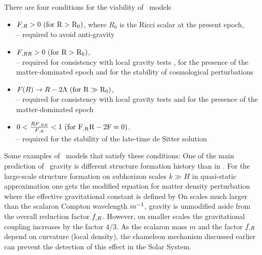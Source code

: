 There are four conditions for the viability of \fR\ models \parencite{Amendola_2007}
\begin{itemize}
	\item $F_{,R}>0\ (\rm{for\ } R>R_0)$, where $R_0$ is the Ricci scalar at the present epoch,\\
	-- required to avoid anti-gravity \parencite{2010deto.book.....A}\\
	\item $F_{,RR}>0\ (\rm{for\ } R>R_0)$,\\
	-- required for consistency with local gravity tests \parencite{2005gr.qc.....5136O}, for the presence of the matter-dominated epoch \parencite{2007PhRvL..98m1302A} and for the stability of cosmological perturbations \parencite{2007PhRvD..75d4004S}\\
	\item $F(R)\rightarrow R-2\Lambda\ (\rm{for\ } R\gg R_0)$,\\
	-- required for consistency with local gravity tests \parencite{2008PhRvD..77b3507T} and for the presence of the matter-dominated epoch \parencite{Amendola_2007}\\
	\item $0<\frac{RF\RR}{F\R}<1\ (\rm{for\ } F\R R-2F=0)$.\\
	-- required for the stability of the late-time de Sitter solution \parencite{1988PhLB..202..198M}
\end{itemize}
Some examples of \fR\ models that satisfy these conditions:
One of the main prediction of \fR\ gravity is different structure formation history than in \LCDM. For the large-scale structure formation on subhorizon scales \mbox{$k\gg H$} in quasi-static approximation one gets the modified equation for matter density perturbation \parencite{2011RSPTA.369.4947B}
where the effective gravitational constant is defined by
On scales much larger than the scalaron Compton wavelength $m^{-1}$, gravity is unmodified aside from the overall reduction factor $f_{,R}$. However, on smaller scales the gravitational coupling increases by the factor $4/3$. As the scalaron mass $m$ and the factor $f_{,R}$ depend on curvature (local density), the chameleon mechanism discussed earlier can prevent the detection of this effect in the Solar System.

